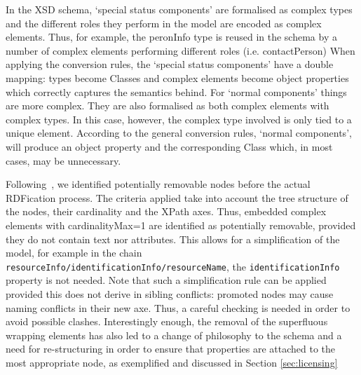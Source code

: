 \documentclass{llncs}
\begin{document}
{\begin{itemize}
\end{itemize}
In the XSD schema, `special status components' are formalised as complex types
and the different roles they perform in the model are encoded as complex
elements. Thus, for example, the peronInfo type is reused in the schema by a
number of complex elements performing different roles (i.e. contactPerson) When
applying the conversion rules, the `special status components' have a double
mapping: types become Classes and complex elements become object properties
which correctly captures the semantics behind. For `normal components' things
are more complex. They are also formalised as both complex elements with complex
types. In this case, however, the complex type involved is only tied to a unique
element. According to the general conversion rules, `normal components',  will
produce an object property and the corresponding Class which, in most cases, may
be unnecessary. 

Following~\cite{Villegas2014}, we identified potentially removable nodes before
the actual RDFication process. The criteria applied take into account the tree
structure of the nodes, their cardinality and the XPath axes. Thus, embedded
complex elements with cardinalityMax=1 are identified as potentially removable,
provided they do not contain text nor attributes. This allows for a
simplification of the model, for example in the chain {\tt
resourceInfo/identificationInfo/resourceName}, the {\tt identificationInfo}
property is not needed.
Note that such a simplification rule can be applied provided this does not derive in sibling conflicts: promoted nodes may cause naming conflicts in their new axe. Thus, a careful checking is needed in order to avoid possible clashes.
Interestingly enough, the removal of the superfluous wrapping elements has also led to a change of philosophy to the schema and a need for re-structuring in order to ensure that properties are attached to the most appropriate node, as exemplified and discussed in Section \ref{sec:licensing}

}
\end{document}
